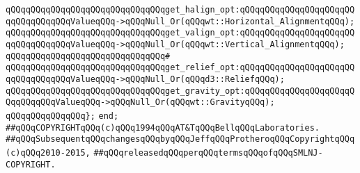 \verb|qQQqqQQqqQQqqQQqqQQqqQQqqQQqqQQqget_halign_opt:qQQqqQQqqQQqqQQqqQQqqQQqqQQqqQQqqQQqValueqQQq->qQQqNull_Or(qQQqwt::Horizontal_AlignmentqQQq);|\newline
\verb|qQQqqQQqqQQqqQQqqQQqqQQqqQQqqQQqget_valign_opt:qQQqqQQqqQQqqQQqqQQqqQQqqQQqqQQqqQQqValueqQQq->qQQqNull_Or(qQQqwt::Vertical_AlignmentqQQq);|\newline
\verb|qQQqqQQqqQQqqQQqqQQqqQQqqQQqqQQq#|\newline
\verb|qQQqqQQqqQQqqQQqqQQqqQQqqQQqqQQqget_relief_opt:qQQqqQQqqQQqqQQqqQQqqQQqqQQqqQQqqQQqValueqQQq->qQQqNull_Or(qQQqd3::ReliefqQQq);|\newline
\verb|qQQqqQQqqQQqqQQqqQQqqQQqqQQqqQQqget_gravity_opt:qQQqqQQqqQQqqQQqqQQqqQQqqQQqqQQqValueqQQq->qQQqNull_Or(qQQqwt::GravityqQQq);|\newline
\newline
\verb|qQQqqQQqqQQqqQQq};|\newline
\verb|end;|\newline
\newline
\verb|##qQQqCOPYRIGHTqQQq(c)qQQq1994qQQqAT&TqQQqBellqQQqLaboratories.|\newline
\verb|##qQQqSubsequentqQQqchangesqQQqbyqQQqJeffqQQqProtheroqQQqCopyrightqQQq(c)qQQq2010-2015,|\newline
\verb|##qQQqreleasedqQQqperqQQqtermsqQQqofqQQqSMLNJ-COPYRIGHT.|\newline

